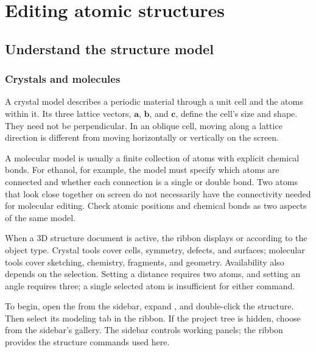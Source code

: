 \chapter{Editing atomic structures}\label{ch:modeling}


\section{Understand the structure model}

\subsection{Crystals and molecules}

A crystal model describes a periodic material through a unit cell and the atoms within it. Its three lattice vectors, $\mathbf a$, $\mathbf b$, and $\mathbf c$, define the cell's size and shape. They need not be perpendicular. In an oblique cell, moving along a lattice direction is different from moving horizontally or vertically on the screen.

A molecular model is usually a finite collection of atoms with explicit chemical bonds. For ethanol, for example, the model must specify which atoms are connected and whether each connection is a single or double bond. Two atoms that look close together on screen do not necessarily have the connectivity needed for molecular editing. Check atomic positions and chemical bonds as two aspects of the same model.

When a 3D structure document is active, the ribbon displays  or  according to the object type. Crystal tools cover cells, symmetry, defects, and surfaces; molecular tools cover sketching, chemistry, fragments, and geometry. Availability also depends on the selection. Setting a distance requires two atoms, and setting an angle requires three; a single selected atom is insufficient for either command.

To begin, open the  from the sidebar, expand , and double-click the structure. Then select its modeling tab in the ribbon. If the project tree is hidden, choose  from the sidebar's  gallery. The sidebar controls working panels; the ribbon provides the structure commands used here.

